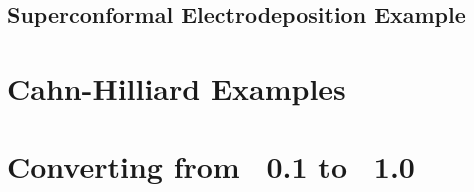\documentclass[letterpaper]{book}
\begin{document}
\newpage
\section*{Superconformal Electrodeposition Example}






\chapter{Cahn-Hilliard Examples}



\chapter{Converting from \FiPy{}~0.1 to \FiPy{}~1.0}
\label{chap:Update0.1to1.0}




\backmatter

\end{document}
